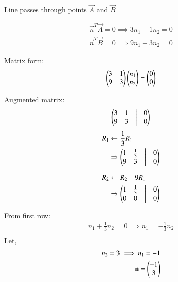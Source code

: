 \documentclass[journal]{IEEEtran}
\begin{document}
 

Line passes through points $\vec{A}$ and $\vec{B}$

\begin{align}
\vec{n}^T \vec{A} = 0 \implies 3 n_1 + 1 n_2 = 0
\end{align}
\begin{align}
    \vec{n}^T \vec{B} = 0 \implies 9 n_1 + 3 n_2 = 0
\end{align}


Matrix form:
\begin{align}
    \begin{pmatrix}3 & 1 \\ 9 & 3\end{pmatrix} \begin{pmatrix}n_1\\n_2\end{pmatrix} = \begin{pmatrix}0\\0\end{pmatrix}
\end{align}

Augmented matrix:
\begin{align}
\begin{pmatrix}3 & 1 &\big|& 0 \\ 9 & 3 & \big| & 0\end{pmatrix}
\end{align}
\begin{align}R_{1} &\leftarrow \frac{1}{3}R_{1} \nonumber\\&
\Rightarrow \begin{pmatrix}1 & \frac{1}{3} & \big| & 0 \\ 9 & 3 & \big| & 0\end{pmatrix}
\end{align}

\begin{align}R_{2} &\leftarrow R_{2}-9R_{1} \nonumber\\&
\Rightarrow \begin{pmatrix}1 & \frac{1}{3} & \big| & 0 \\ 0 & 0 & \big| & 0\end{pmatrix}
\end{align}

From first row:
\begin{align}
n_1 + \frac{1}{3} n_2 = 0 \implies n_1 = -\frac{1}{3} n_2\\
\end{align}
Let,
\begin{align}
n_2 = 3 \implies n_1 = -1\\
\mathbf{n} = \begin{pmatrix}-1\\3\end{pmatrix}
\end{align}
\end{document}
